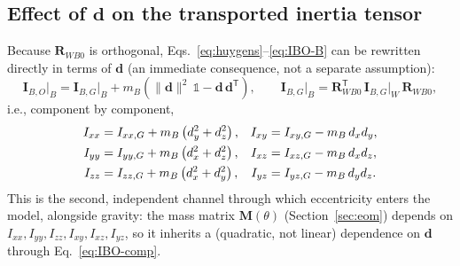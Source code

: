 \documentclass[11pt,a4paper]{article}
\numberwithin{equation}{section}
\newcommand{\bs}[1]{\boldsymbol{#1}}
\newcommand{\T}{^{\mathsf T}}
\begin{document}
\subsection{Effect of $\bs d$ on the transported inertia tensor}
\label{subsec:eccentricity-in-M}

Because $\bs R_{WB0}$ is orthogonal, Eqs.~\eqref{eq:huygens}--\eqref{eq:IBO-B} can be rewritten directly in terms of $\bs d$ (an immediate consequence, not a separate assumption):
\begin{equation}
\bs I_{B,O}\big|_B = \bs I_{B,G}\big|_B + m_B\left(\lVert\bs d\rVert^2\,\mathbb 1 - \bs d\,\bs d\T\right), \qquad \bs I_{B,G}\big|_B = \bs R_{WB0}\T\,\bs I_{B,G}\big|_W\,\bs R_{WB0},
\label{eq:IBO-B-d}
\end{equation}
i.e., component by component,
\begin{align}
I_{xx} &= I_{xx,G} + m_B\left(d_y^2+d_z^2\right), &
I_{xy} &= I_{xy,G} - m_B\,d_x d_y, \notag\\
I_{yy} &= I_{yy,G} + m_B\left(d_x^2+d_z^2\right), &
I_{xz} &= I_{xz,G} - m_B\,d_x d_z, \label{eq:IBO-comp}\\
I_{zz} &= I_{zz,G} + m_B\left(d_x^2+d_y^2\right), &
I_{yz} &= I_{yz,G} - m_B\,d_y d_z. \notag
\end{align}
This is the second, independent channel through which eccentricity enters the model, alongside gravity: the mass matrix $\bs M(\theta)$ (Section~\ref{sec:eom}) depends on $I_{xx},I_{yy},I_{zz},I_{xy},I_{xz},I_{yz}$, so it inherits a (quadratic, not linear) dependence on $\bs d$ through Eq.~\eqref{eq:IBO-comp}.
\end{document}
